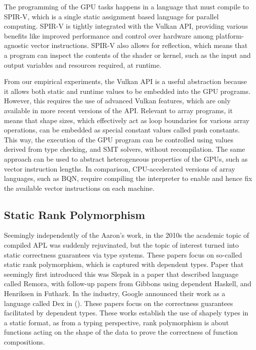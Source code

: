 \documentclass[10pt,a4paper]{article}
\begin{document}
The programming of the GPU tasks happens in a language that must compile to SPIR-V, which is a single static assignment based language for parallel computing.
SPIR-V is tightly integrated with the Vulkan API, providing various benefits like improved performance and control over hardware among platform-agnostic vector instructions.
SPIR-V also allows for reflection, which means that a program can inspect the contents of the shader or kernel, such as the input and output variables and resources required, at runtime.

From our empirical experiments, the Vulkan API is a useful abstraction because it allows both static and runtime values to be embedded into the GPU programs.
However, this requires the use of advanced Vulkan features, which are only available in more recent versions of the API.
Relevant to array programs, it means that shape sizes, which effectively act as loop boundaries for various array operations, can be embedded as special constant values called push constants. 
This way, the execution of the GPU program can be controlled using values derived from type checking, and SMT solvers, without recompilation.
The same approach can be used to abstract heterogeneous properties of the GPUs, such as vector instruction lengths.
In comparison, CPU-accelerated versions of array languages, such as BQN, require compiling the interpreter to enable and hence fix the available vector instructions on each machine.


\subsection{Static Rank Polymorphism}

Seemingly independently of the Aaron's work, in the 2010s the academic topic of compiled APL was suddenly rejuvinated, but the topic of interest turned into static correctness guarantees via type systems.
These papers focus on so-called static rank polymorphism, which is captured with dependent types. Paper that seemingly first introduced this was Slepak in a paper that described language called Remora, with follow-up papers from Gibbons using dependent Haskell, and Henriksen in Futhark. In the industry, Google announced their work as a language called Dex in (). These papers focus on the correctness guarantees facilitated by dependent types. These works establish the use of shapely types in a static format, as from a typing perspective, rank polymorphism is about functions acting on the shape of the data to prove the correctness of function compositions.
\end{document}

